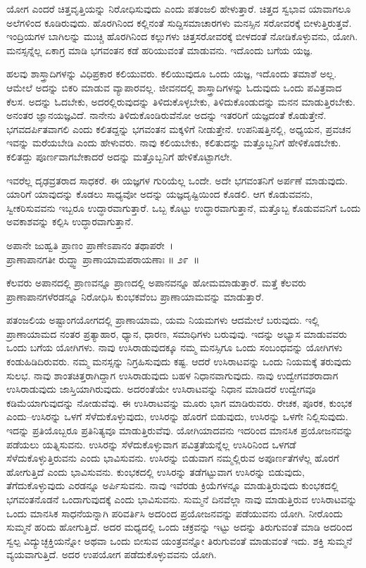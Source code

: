 ಯೋಗ ಎಂದರೆ ಚಿತ್ತವೃತ್ತಿಯನ್ನು ನಿರೋಧಿಸುವುದು ಎಂದು ಪತಂಜಲಿ ಹೇಳುತ್ತಾರೆ. ಚಿತ್ತದ ಸ್ವಭಾವ ಯಾವಾಗಲೂ ಅಲೆಗಳಿಂದ ಕೂಡಿರುವುದು. ಹೊರಗಿನಿಂದ ಕಲ್ಲಿನಂತೆ ಸುದ್ದಿಸಮಾಚಾರಗಳು ಮನಸ್ಸಿನ ಸರೋವರಕ್ಕೆ ಬೀಳುತ್ತಿರುತ್ತವೆ. ಇಂದ್ರಿಯಗಳ ಬಾಗಿಲನ್ನು ಮುಚ್ಚಿ ಹೊರಗಿನಿಂದ ಕಲ್ಲುಗಳು ಚಿತ್ತಸರೋವರಕ್ಕೆ ಬೀಳದಂತೆ ನೋಡಿಕೊಳ್ಳುವನು, ಯೋಗಿ. ಮನಸ್ಸನ್ನೆಲ್ಲ ಏಕಾಗ್ರ ಮಾಡಿ ಭಗವಂತನ ಕಡೆ ಹರಿಯುವಂತೆ ಮಾಡುವನು. ಇದೊಂದು ಬಗೆಯ ಯಜ್ಞ.

ಹಲವು ಶಾಸ್ತ್ರಾದಿಗಳನ್ನು ವಿಧಿಪ್ರಕಾರ ಕಲಿಯುವರು. ಕಲಿಯುವುದೂ ಒಂದು ಯಜ್ಞ, ಇದೊಂದು ತಮಾಶೆ ಅಲ್ಲ. ಆಮೇಲೆ ಅದನ್ನು ಬಿಕರಿ ಮಾಡುವ ವ್ಯಾಪಾರವಲ್ಲ. ಜೀವನದಲ್ಲಿ ಶಾಸ್ತ್ರಾದಿಗಳನ್ನು ಓದುವುದು ಒಂದು ಪವಿತ್ರವಾದ ಕೆಲಸ. ಅದನ್ನು ಓದಬೇಕು, ಅದರಲ್ಲಿರುವುದನ್ನು ತಿಳಿದುಕೊಳ್ಳಬೇಕು, ತಿಳಿದುಕೊಂಡುದನ್ನು ಮನನ ಮಾಡುತ್ತಿರಬೇಕು. ಅನಂತರ ಜ್ಞಾನಯಜ್ಞವಿದೆ. ನಾನೇನು ತಿಳಿದುಕೊಂಡಿರುವೆನೋ ಅದನ್ನು ಇತರರಿಗೆ ಯಜ್ಞದಂತೆ ಕೊಡುತ್ತೇನೆ. ಭಗವದರ್ಪಿತವಾಗಲಿ ಎಂದು ಕಲಿತದ್ದನ್ನು ಭಗವಂತನ ಮಕ್ಕಳಿಗೆ ನೀಡುತ್ತೇನೆ. ಉಪನಿಷತ್ತಿನಲ್ಲಿ, ಅಧ್ಯಯನ, ಪ್ರವಚನ ಇವನ್ನು ಮರೆಯಬೇಡಿ ಎಂದು ಹೇಳುವರು. ನಾವು ಕಲಿಯಬೇಕು, ಕಲಿತುದನ್ನು ಮತ್ತೊಬ್ಬನಿಗೆ ಹೇಳಿಕೊಡಬೇಕು. ಕಲಿತದ್ದು ಪೂರ್ಣವಾಗಬೇಕಾದರೆ ಅದನ್ನು ಮತ್ತೊಬ್ಬನಿಗೆ ಹೇಳಿಕೊಟ್ಟಾಗಲೇ.

ಇವರೆಲ್ಲ ದೃಢವ್ರತರಾದ ಸಾಧಕರೆ. ಈ ಯಜ್ಞಗಳ ಗುರಿಯೆಲ್ಲ ಒಂದೇ. ಅದೇ ಭಗವಂತನಿಗೆ ಅರ್ಪಣೆ ಮಾಡುವುದು. ಯಾರಿಗೆ ಯಾವುದನ್ನು ಕೊಡಲು ಸಾಧ್ಯವೋ ಅದನ್ನು ಯಜ್ಞದೃಷ್ಟಿಯಿಂದ ಕೊಡಲಿ. ಆಗ ಕೊಡುವವನು, ಸ್ವೀಕರಿಸುವವನು ಇಬ್ಬರೂ ಉದ್ಧಾರವಾಗುತ್ತಾರೆ. ಒಬ್ಬ ಕೊಟ್ಟು ಉದ್ಧಾರವಾಗುತ್ತಾನೆ, ಮತ್ತೊಬ್ಬ ಕೊಡುವವನಿಗೆ ಒಂದು ಅವಕಾಶವನ್ನು ಕಲ್ಪಿಸಿ ಉದ್ಧಾರವಾಗುತ್ತಾನೆ.

\begin{shloka}
ಅಪಾನೇ ಜುಹ್ವತಿ ಪ್ರಾಣಂ ಪ್ರಾಣೇಽಪಾನಂ ತಥಾಪರೇ~।\\ಪ್ರಾಣಾಪಾನಗತೀ ರುದ್ಧ್ವಾ ಪ್ರಾಣಾಯಾಮಪರಾಯಣಾಃ \hfill॥ ೨೯~॥
\end{shloka}

\begin{artha}
ಕೆಲವರು ಅಪಾನದಲ್ಲಿ ಪ್ರಾಣವನ್ನೂ ಪ್ರಾಣದಲ್ಲಿ ಅಪಾನವನ್ನೂ ಹೋಮಮಾಡುತ್ತಾರೆ. ಮತ್ತೆ ಕೆಲವರು ಪ್ರಾಣಾಪಾನಗಳೆರಡನ್ನೂ ನಿರೋಧಿಸಿ ಕುಂಭಕವೆಂಬ ಪ್ರಾಣಾಯಾಮವನ್ನು ಮಾಡುತ್ತಾರೆ.
\end{artha}

ಪತಂಜಲಿಯ ಅಷ್ಟಾಂಗಯೋಗದಲ್ಲಿ ಪ್ರಾಣಾಯಾಮ, ಯಮ ನಿಯಮಗಳು ಆದಮೇಲೆ ಬರುವುದು. ಇಲ್ಲಿ ಪ್ರಾಣಾಯಾಮದ ನಂತರ ಪ್ರತ್ಯಾಹಾರ, ಧ್ಯಾನ, ಧಾರಣ, ಸಮಾಧಿಗಳು ಬರುವುವು. ಇದನ್ನು ಅಭ್ಯಾಸ ಮಾಡುವವರು ಒಂದು ಬಗೆಯ ಯೋಗಿಗಳು. ನಾವು ಉಸಿರಾಡುವುದಕ್ಕೂ ನಮ್ಮ ಮನಸ್ಸಿಗೂ ಒಂದು ಸಂಬಂಧವನ್ನು ಯೋಗಿಗಳು ಕಂಡುಹಿಡಿದಿರುವರು. ನಮ್ಮ ಮನಸ್ಸನ್ನು ನಿಗ್ರಹಿಸುವುದು ಕಷ್ಟ. ಆದರೆ ಉಸಿರಾಟವನ್ನು ಒಂದು ನಿಯಮಕ್ಕೆ ತರುವುದು ಸುಲಭ. ನಾವು ಶಾಂತಚಿತ್ತರಾಗಿದ್ದಾಗ ಉಸಿರಾಡುವುದು ಬಹಳ ನಿಧಾನವಾಗುವುದು. ನಾವು ಉದ್ವೇಗವಶರಾದಾಗ ಉಸಿರಾಡುವುದು ಜಾಸ್ತಿಯಾಗಿರುವುದು. ಅದರಂತೆಯೇ ಉಸಿರಾಟವನ್ನು ನಿಧಾನ ಮಾಡಿದರೆ ಉದ್ವೇಗವೂ ಕಡಿಮೆಯಾಗುವುದನ್ನು ನೋಡುವೆವು. ಈ ಉಸಿರಾಟವನ್ನು ಮೂರು ಭಾಗ ಮಾಡಿರುವರು. ರೇಚಕ, ಪೂರಕ, ಕುಂಭಕ ಎಂದು–ಉಸಿರನ್ನು ಒಳಗೆ ಸೆಳೆದುಕೊಳ್ಳುವುದು, ಉಸಿರನ್ನು ಹೊರಗೆ ಬಿಡುವುದು, ಉಸಿರನ್ನು ಒಳಗೇ ನಿಲ್ಲಿಸುವುದು. ಇದನ್ನು ಪ್ರತಿಯೊಬ್ಬರೂ ಪ್ರತಿನಿತ್ಯವೂ ಮಾಡುತ್ತಿರುವೆವು. ಯೋಗಿಯಾದವನು ಇದರಿಂದ ಮಾನಸಿಕ ಪ್ರಯೋಜನವನ್ನು ಪಡೆಯಲು ಯತ್ನಿಸುವನು. ಉಸಿರನ್ನು ಸೆಳೆದುಕೊಳ್ಳುವಾಗ ಪವಿತ್ರತೆಯನ್ನೆಲ್ಲ ಉಸಿರಿನಿಂದ ಒಳಗಡೆ ಸೆಳೆದುಕೊಳ್ಳುತ್ತಿರುವನು ಎಂದು ಭಾವಿಸುವನು. ಉಸಿರನ್ನು ಬಿಡುವಾಗ ನಮ್ಮಲ್ಲಿರುವ ಅಪೂರ್ಣತೆಗಳೆಲ್ಲ ಹೊರಗೆ ಹೋಗುತ್ತಿದೆ ಎಂದು ಭಾವಿಸುವನು. ಕುಂಭಕದಲ್ಲಿ ಉಸಿರನ್ನು ತಡೆಗಟ್ಟುವಾಗ ಉಸಿರನ್ನು ಬಿಡುವುದು, ತೆಗೆದುಕೊಳ್ಳುವುದು ಎರಡನ್ನೂ ಅರ್ಪಿಸುವನು. ನಾವು ಇವೆರಡು ಕ್ರಿಯೆಗಳನ್ನೂ ಮಾಡುತ್ತಿರುವುದು ಕುಂಭಕದಲ್ಲಿ ಭಗವಂತನೊಡನೆ ಒಂದಾಗುವುದಕ್ಕೆ ಎಂದು ಭಾವಿಸುವನು. ಸುಮ್ಮನೆ ದಿನವೆಲ್ಲಾ ನಾವು ಮಾಡುತ್ತಿರುವ ಉಸಿರಾಟವನ್ನು ಒಂದು ಮಾನಸಿಕ ಸಾಧನೆಯನ್ನಾಗಿ ಪರಿವರ್ತಿಸಿ ಅದರಿಂದ ಪ್ರಯೋಜನವನ್ನು ಪಡೆಯುವನು ಯೋಗಿ. ನೀರೊಂದು ಸುಮ್ಮನೆ ಹರಿದು ಹೋಗುತ್ತಿದೆ. ಅದರ ಮಧ್ಯದಲ್ಲಿ ಒಂದು ಚಕ್ರವನ್ನು ಇಟ್ಟು ಅದನ್ನು ತಿರುಗುವಂತೆ ಮಾಡಿ ಅದರಿಂದ ಸ್ವಲ್ಪ ವಿದ್ಯುಚ್ಛಕ್ತಿಯನ್ನೋ ಅಥವಾ ಒಂದು ಬೀಸುವ ಯಂತ್ರವನ್ನೋ ತಿರುಗುವಂತೆ ಮಾಡುವಂತೆ ಇದು. ಶಕ್ತಿ ಸುಮ್ಮನೆ ವ್ಯಯವಾಗುತ್ತಿದೆ. ಅದರ ಉಪಯೋಗ ಪಡೆದುಕೊಳ್ಳುವವನು ಯೋಗಿ.

